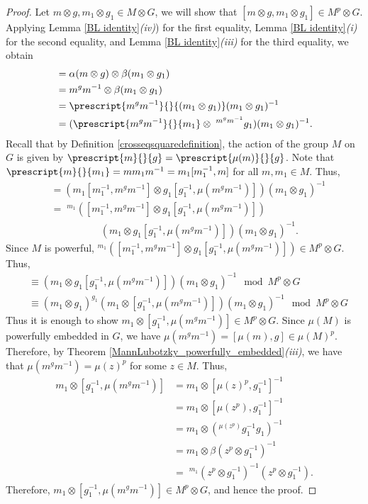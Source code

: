 \documentclass[12pt]{elsarticle}
\newtheorem*{main corollary*}{Main Corollary}
\theoremstyle{definition}
\begin{document}
\begin{proof}
    Let $m\otimes g, m_1\otimes g_1\in M\otimes G$, we will show that $[m\otimes g, m_1\otimes g_1]\in M^p\otimes G$. Applying Lemma \ref{BL identity}\textit{(iv)}) for the first equality, Lemma \ref{BL identity}\textit{(i)} for the second equality, and Lemma \ref{BL identity}\textit{(iii)} for the third equality, we obtain
   \begin{align*}
       [m\otimes g, m_1\otimes g_1]&
       =\alpha(m\otimes g)\otimes \beta(m_1\otimes g_1) \\
       &=m^gm^{-1}\otimes \beta(m_1\otimes g_1)\\
       &=\prescript{m^gm^{-1}}{}{(m_1\otimes g_1)}(m_1\otimes g_1)^{-1} \\
       &=(\prescript{m^gm^{-1}}{}{m_1}\otimes\; ^{m^gm^{-1}}g_1)(m_1\otimes g_1)^{-1}.
       \end{align*}
       Recall that by Definition \ref{crosseqsquaredefinition}, the action of the group $M$ on $G$ is given by $\prescript{m}{}{g}=\prescript{\mu(m)}{}{g}$.  Note that $\prescript{m}{}{m_1}=mm_1m^{-1}=m_1[m_1^{-1},m]$ for all $m,m_1 \in M$. Thus, 
       \begin{align*}
       [m\otimes g, m_1\otimes g_1]
       &=(m_1[m_1^{-1},{m^gm^{-1}}]\otimes g_1[g_1^{-1},\mu({m^gm^{-1}})])(m_1\otimes g_1)^{-1}\\
       &=\;^{m_1}([m_1^{-1},{m^gm^{-1}}]\otimes g_1[g_1^{-1},\mu({m^gm^{-1}})])\\&\qquad \qquad\quad(m_1\otimes g_1[g_1^{-1},\mu({m^gm^{-1}})])(m_1\otimes g_1)^{-1}.
   \end{align*}Since $M$ is powerful, $^{m_1}([m_1^{-1},{m^gm^{-1}}]\otimes g_1[g_1^{-1},\mu({m^gm^{-1}})])\in M^p\otimes G$. Thus,
   \begin{align*}
       [m\otimes g, m_1\otimes g_1]&\equiv (m_1\otimes g_1[g_1^{-1},\mu({m^gm^{-1}})])(m_1\otimes g_1)^{-1}\mod M^p\otimes G\\
       &\equiv (m_1\otimes g_1)^{g_1}(m_1\otimes [g_1^{-1},\mu({m^gm^{-1}})])(m_1\otimes g_1)^{-1}\mod M^p\otimes G
   \end{align*}Thus it is enough to show $m_1\otimes [g_1^{-1},\mu({m^gm^{-1}})]\in M^p\otimes G$. Since $\mu(M)$ is powerfully embedded in $G$, we have ${\mu({m^gm^{-1}})=[\mu(m),g]}\in \mu(M)^p$. Therefore, by Theorem \ref{MannLubotzky_powerfully_embedded}\textit{(iii)}, we have that ${\mu({m^gm^{-1}})=\mu(z)^p}$ for some $z\in M$. Thus,
   \begin{align*}
       m_1\otimes [g_1^{-1},\mu({m^gm^{-1}})]&= m_1\otimes[\mu(z)^p,g_1^{-1}]^{-1}\\
       &=m_1\otimes[\mu(z^p),g_1^{-1}]^{-1}\\
       &=m_1\otimes (^{\mu(z^p)}g^{-1}_1g_1)^{-1}\\
       &=m_1\otimes\beta(z^p\otimes g^{-1}_1)^{-1}\\
       &=\;^{m_1}(z^p\otimes g^{-1}_1)^{-1}(z^p\otimes g^{-1}_1).
   \end{align*}
   Therefore, $ m_1\otimes [g_1^{-1},\mu({m^gm^{-1}})]\in M^p\otimes G$, and hence the proof.
\end{proof}
\end{document}
